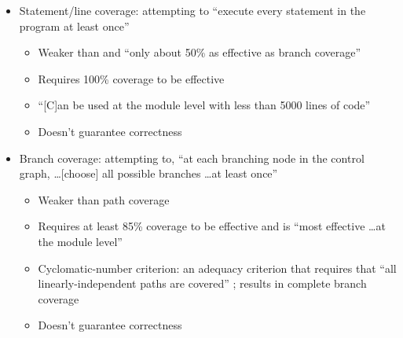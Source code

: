 \begin{itemize}
      \item Statement/line coverage: attempting to ``execute every statement in
            the program at least once'' \cite[p.~119]{patton_software_2006}
            \begin{itemize}
                  \item Weaker than \cite[p.~421]{van_vliet_software_2000} and
                        ``only about 50\% as effective as branch coverage''
                        \cite[p.~481]{peters_software_2000}
                  \item Requires 100\% coverage to be effective
                        \cite[p.~481]{peters_software_2000}
                  \item ``[C]an be used at the module level with less than 5000
                        lines of code'' \cite[p.~481]{peters_software_2000}
                  \item Doesn't guarantee correctness
                        \cite[p.~421]{van_vliet_software_2000}
            \end{itemize}
      \item Branch coverage: attempting to, ``at each branching node in the
            control graph, \dots [choose] all possible branches \dots at least
            once'' \cite[p.~421]{van_vliet_software_2000}
            \begin{itemize}
                  \item Weaker than path coverage
                        \cite[p.~433]{van_vliet_software_2000}
                  \item Requires at least 85\% coverage to be effective and is
                        ``most effective \dots at the module level''
                        \cite[p.~481]{peters_software_2000}
                  \item Cyclomatic-number criterion: an adequacy criterion that
                        requires that ``all linearly-independent paths are
                        covered'' \cite[p.~423]{van_vliet_software_2000};
                        results in complete branch coverage
                  \item Doesn't guarantee correctness
                        \cite[p.~421]{van_vliet_software_2000}

\end{itemize}
\end{itemize}

